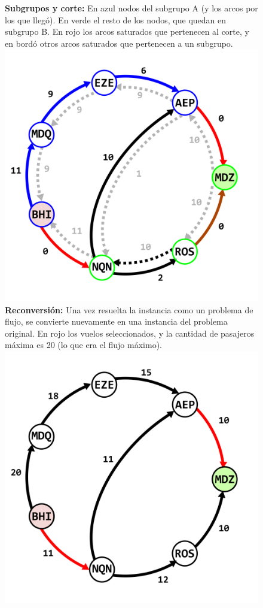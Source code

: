 \documentclass[../tp3_grupo404.tex]{subfiles}
\begin{document}
    \begin{figure}[H]
    \centering
    \subcaptionbox
        {\label{fig:Vuelos9}\textbf{Subgrupos y corte:} En azul nodos del subgrupo A (y los arcos por los que llegó).
        En verde el resto de los nodos, que quedan en subgrupo B. En rojo los arcos saturados que pertenecen al corte,
        y en bordó otros arcos saturados que pertenecen a un subgrupo.}
        {\includegraphics[width=0.4\linewidth,angle=0,origin=c]{out/ejA9.png}}
    \subcaptionbox
        {\label{fig:Vuelos10}\textbf{Reconversión:} Una vez resuelta la instancia como un problema de flujo, se convierte
        nuevamente en una instancia del problema original. En rojo los vuelos seleccionados, y la cantidad
        de pasajeros máxima es 20 (lo que era el flujo máximo).}
        {\includegraphics[width=0.4\linewidth,angle=0,origin=c]{out/ejA10.png}}
\end{figure}

\end{document}
